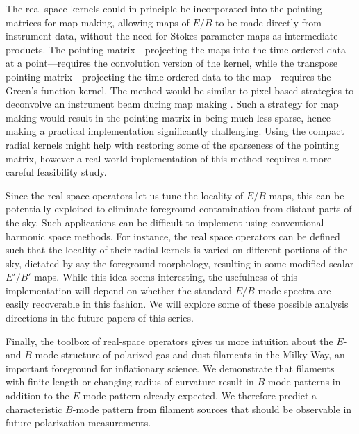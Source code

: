 The real space kernels could in principle be incorporated into the pointing matrices for map making, allowing maps of $E/B$ to be made directly from instrument data, without the need for Stokes parameter maps as intermediate products.
  The pointing matrix---projecting the maps into the time-ordered data at a point---requires the convolution version of the kernel, while the transpose pointing matrix---projecting the time-ordered data to the map---requires the Green's function kernel.
  The method would be similar to pixel-based strategies to deconvolve an instrument beam during map making \citep[e.g.][]{2010ApJS..187..212C}. Such a strategy for map making would result in the pointing matrix in being much less sparse, hence making a practical implementation significantly challenging. Using the compact radial kernels might help with restoring some of the sparseness of the pointing matrix, however a real world implementation of this method requires a more careful feasibility study.
 
Since the real space operators let us tune the locality of $E/B$ maps, this can be potentially exploited to eliminate foreground contamination from distant parts of the sky. Such applications can be difficult to implement using conventional harmonic space methods.  For instance, the real space operators can be defined such that the locality of their radial kernels is varied on different portions of the sky, dictated by say the foreground morphology, resulting in some modified scalar $E'/B'$ maps.  While this idea seems interesting, the usefulness of this implementation will depend on whether the standard $E/B$ mode spectra are easily recoverable in this fashion.  We will explore some of these possible analysis directions in the future papers of this series.

Finally, the toolbox of real-space operators gives us more intuition about the $E$- and $B$-mode structure of polarized gas and dust filaments in the Milky Way, an important foreground for inflationary science. We demonstrate that filaments with finite length or changing radius of curvature result in $B$-mode patterns in addition to the $E$-mode pattern already expected.  We therefore predict a characteristic $B$-mode pattern from filament sources that should be observable in future polarization measurements.
